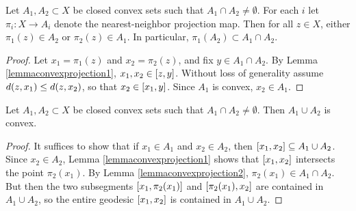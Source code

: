 \begin{lemma}
\label{lemmaconvexprojection2}
Let $A_1, A_2\subset X$ be closed convex sets such that $A_1\cap A_2\neq\emptyset$. For each $i$ let $\pi_i:X\to A_i$ denote the nearest-neighbor projection map. Then for all $z\in X$, either $\pi_1(z)\in A_2$ or $\pi_2(z)\in A_1$. In particular, $\pi_1(A_2) \subset A_1\cap A_2$.
\end{lemma}
\begin{proof}
Let $x_1 = \pi_1(z)$ and $x_2 = \pi_2(z)$, and fix $y\in A_1\cap A_2$. By Lemma \ref{lemmaconvexprojection1}, $x_1,x_2\in [z,y]$. Without loss of generality assume $d(z,x_1)\leq d(z,x_2)$, so that $x_2\in [x_1,y]$. Since $A_1$ is convex, $x_2\in A_1$.
\end{proof}

\begin{lemma}
\label{lemmaconvexunion}
Let $A_1, A_2\subset X$ be closed convex sets such that $A_1\cap A_2\neq\emptyset$. Then $A_1\cup A_2$ is convex.
\end{lemma}
\begin{proof}
It suffices to show that if $x_1\in A_1$ and $x_2\in A_2$, then $[x_1,x_2]\subseteq A_1\cup A_2$. Since $x_2\in A_2$, Lemma \ref{lemmaconvexprojection1} shows that $[x_1,x_2]$ intersects the point $\pi_2(x_1)$. By Lemma \ref{lemmaconvexprojection2}, $\pi_2(x_1)\in A_1\cap A_2$. But then the two subsegments $[x_1,\pi_2(x_1)]$ and $[\pi_2(x_1),x_2]$ are contained in $A_1\cup A_2$, so the entire geodesic $[x_1,x_2]$ is contained in $A_1\cup A_2$.
\end{proof}





